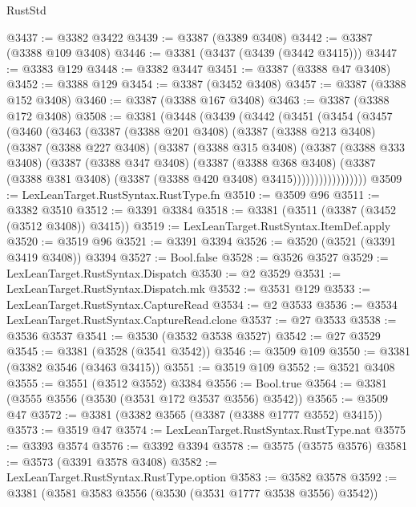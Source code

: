 \begin{lexlean}{RustStd}
\begin{coremodule}
@3437 := @3382 @3422
@3439 := @3387 (@3389 @3408)
@3442 := @3387 (@3388 @109 @3408)
@3446 := @3381 (@3437 (@3439 (@3442 @3415)))
@3447 := @3383 @129
@3448 := @3382 @3447
@3451 := @3387 (@3388 @47 @3408)
@3452 := @3388 @129
@3454 := @3387 (@3452 @3408)
@3457 := @3387 (@3388 @152 @3408)
@3460 := @3387 (@3388 @167 @3408)
@3463 := @3387 (@3388 @172 @3408)
@3508 := @3381
    (@3448
      (@3439
        (@3442
          (@3451
            (@3454
              (@3457
                (@3460
                  (@3463
                    (@3387
                      (@3388 @201 @3408)
                      (@3387
                        (@3388 @213 @3408)
                        (@3387
                          (@3388 @227 @3408)
                          (@3387
                            (@3388 @315 @3408)
                            (@3387
                              (@3388 @333 @3408)
                              (@3387
                                (@3388 @347 @3408)
                                (@3387
                                  (@3388 @368 @3408)
                                  (@3387
                                    (@3388 @381 @3408)
                                    (@3387 (@3388 @420 @3408) @3415)))))))))))))))))
@3509 := LexLeanTarget.RustSyntax.RustType.fn
@3510 := @3509 @96
@3511 := @3382 @3510
@3512 := @3391 @3384
@3518 := @3381 (@3511 (@3387 (@3452 (@3512 @3408)) @3415))
@3519 := LexLeanTarget.RustSyntax.ItemDef.apply
@3520 := @3519 @96
@3521 := @3391 @3394
@3526 := @3520 (@3521 (@3391 @3419 @3408)) @3394
@3527 := Bool.false
@3528 := @3526 @3527
@3529 := LexLeanTarget.RustSyntax.Dispatch
@3530 := @2 @3529
@3531 := LexLeanTarget.RustSyntax.Dispatch.mk
@3532 := @3531 @129
@3533 := LexLeanTarget.RustSyntax.CaptureRead
@3534 := @2 @3533
@3536 := @3534 LexLeanTarget.RustSyntax.CaptureRead.clone
@3537 := @27 @3533
@3538 := @3536 @3537
@3541 := @3530 (@3532 @3538 @3527)
@3542 := @27 @3529
@3545 := @3381 (@3528 (@3541 @3542))
@3546 := @3509 @109
@3550 := @3381 (@3382 @3546 (@3463 @3415))
@3551 := @3519 @109
@3552 := @3521 @3408
@3555 := @3551 (@3512 @3552) @3384
@3556 := Bool.true
@3564 := @3381 (@3555 @3556 (@3530 (@3531 @172 @3537 @3556) @3542))
@3565 := @3509 @47
@3572 := @3381 (@3382 @3565 (@3387 (@3388 @1777 @3552) @3415))
@3573 := @3519 @47
@3574 := LexLeanTarget.RustSyntax.RustType.nat
@3575 := @3393 @3574
@3576 := @3392 @3394
@3578 := @3575 (@3575 @3576)
@3581 := @3573 (@3391 @3578 @3408)
@3582 := LexLeanTarget.RustSyntax.RustType.option
@3583 := @3582 @3578
@3592 := @3381 (@3581 @3583 @3556 (@3530 (@3531 @1777 @3538 @3556) @3542))

\end{coremodule}
\end{lexlean}
